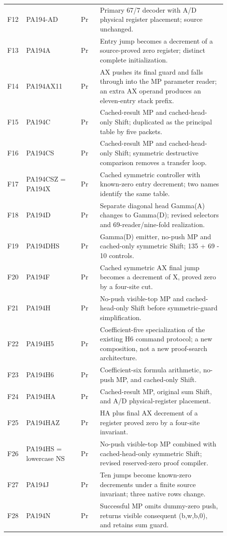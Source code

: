 \begin{longtable}{@{}p{0.055\linewidth}p{0.235\linewidth}p{0.08\linewidth}p{0.535\linewidth}@{}}
F12 & PA194-AD & Pr & Primary 67/7 decoder with A/D physical register placement; source unchanged. \\
F13 & PA194A & Pr & Entry jump becomes a decrement of a source-proved zero register; distinct complete initialization. \\
F14 & PA194AX11 & Pr & AX pushes its final guard and falls through into the MP parameter reader; an extra AX operand produces an eleven-entry stack prefix. \\
F15 & PA194C & Pr & Cached-result MP and cached-head-only Shift; duplicated as the principal table by five packets. \\
F16 & PA194CS & Pr & Cached-result MP and cached-head-only Shift; symmetric destructive comparison removes a transfer loop. \\
F17 & PA194CSZ = PA194X & Pr & Cached symmetric controller with known-zero entry decrement; two names identify the same table. \\
F18 & PA194D & Pr & Separate diagonal head Gamma(A) changes to Gamma(D); revised selectors and 69-reader/nine-fold realization. \\
F19 & PA194DHS & Pr & Gamma(D) emitter, no-push MP and cached-only symmetric Shift; 135 + 69 - 10 controls. \\
F20 & PA194F & Pr & Cached symmetric AX final jump becomes a decrement of X, proved zero by a four-site cut. \\
F21 & PA194H & Pr & No-push visible-top MP and cached-head-only Shift before symmetric-guard simplification. \\
F22 & PA194H5 & Pr & Coefficient-five specialization of the existing H6 command protocol; a new composition, not a new proof-search architecture. \\
F23 & PA194H6 & Pr & Coefficient-six formula arithmetic, no-push MP, and cached-only Shift. \\
F24 & PA194HA & Pr & Cached-result MP, original sum Shift, and A/D physical-register placement. \\
F25 & PA194HAZ & Pr & HA plus final AX decrement of a register proved zero by a four-site invariant. \\
F26 & PA194HS = lowercase NS & Pr & No-push visible-top MP combined with cached-head-only symmetric Shift; revised reserved-zero proof compiler. \\
F27 & PA194J & Pr & Ten jumps become known-zero decrements under a finite source invariant; three native rows change. \\
F28 & PA194N & Pr & Successful MP omits dummy-zero push, returns visible consequent (b,w,b,0), and retains sum guard. \\

\end{longtable}
